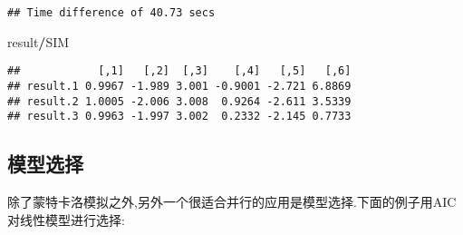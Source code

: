 \documentclass[]{ctexbook}
\newenvironment{Shaded}{\begin{snugshade}}{\end{snugshade}}
\newcommand{\NormalTok}[1]{#1}
\newcommand{\OperatorTok}[1]{\textcolor[rgb]{0.81,0.36,0.00}{\textbf{#1}}}
\begin{document}
\begin{verbatim}
## Time difference of 40.73 secs
\end{verbatim}

\begin{Shaded}
\begin{Highlighting}[]
\NormalTok{result}\OperatorTok{/}\NormalTok{SIM}
\end{Highlighting}
\end{Shaded}

\begin{verbatim}
##            [,1]   [,2]  [,3]    [,4]   [,5]   [,6]
## result.1 0.9967 -1.989 3.001 -0.9001 -2.721 6.8869
## result.2 1.0005 -2.006 3.008  0.9264 -2.611 3.5339
## result.3 0.9963 -1.997 3.002  0.2332 -2.145 0.7733
\end{verbatim}

\hypertarget{section-16}{%
\subsection{模型选择}\label{section-16}}

除了蒙特卡洛模拟之外,另外一个很适合并行的应用是模型选择.下面的例子用AIC对线性模型进行选择:
\end{document}
